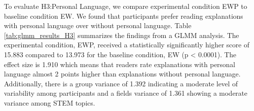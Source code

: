 To evaluate H3:Personal Language, we compare experimental condition EWP to baseline condition EW. We found that participants prefer reading explanations with personal language over without personal language. 
Table \ref{tab:glmm_results_H3} summarizes the findings from a GLMM analysis. The experimental condition, EWP, received a statistically significantly higher score of 15.883 compared to 13.973 for the baseline condition, EW (p < 0.0001). The effect size is 1.910 which means that readers rate explanations with personal language almost 2 points higher than explanations without personal language. Additionally, there is a group variance of 1.392 indicating a moderate level of variability among participants and a fields variance of 1.361 showing a moderate variance among STEM topics. 



